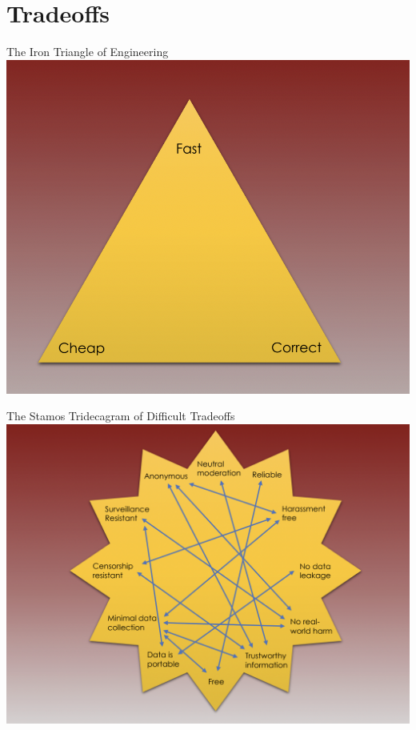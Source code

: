 \documentclass[nobackground,dvipsnames,table]{beamer}
\begin{document}
\section{Tradeoffs}

\begin{frame}{The Iron Triangle of Engineering}
    \centering
    \includegraphics[height=0.9\textheight]{iron-triangle}
\end{frame}

\begin{frame}{The Stamos Tridecagram of Difficult Tradeoffs}
    \centering
    \includegraphics[width=\textwidth]{tridecagram.png}
\end{frame}
\end{document}
